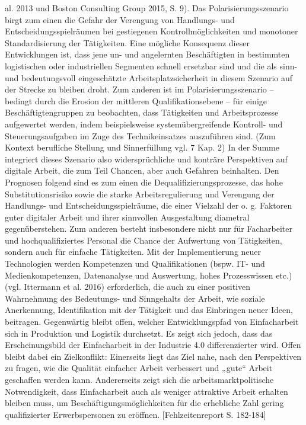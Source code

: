 al. 2013 und Boston Consulting Group 2015, S. 9). Das
Polarisierungsszenario birgt zum einen die Gefahr der
Verengung von Handlungs- und Entscheidungsspielräumen bei gestiegenen Kontrollmöglichkeiten und
monotoner Standardisierung der Tätigkeiten. Eine
mögliche Konsequenz dieser Entwicklungen ist, dass
jene un- und angelernten Beschäftigten in bestimmten
logistischen oder industriellen Segmenten schnell ersetzbar sind und die als sinn- und bedeutungsvoll eingeschätzte Arbeitsplatzsicherheit in diesem Szenario
auf der Strecke zu bleiben droht. Zum anderen ist im
Polarisierungsszenario – bedingt durch die Erosion
der mittleren Qualifikationsebene – für einige Beschäftigtengruppen zu beobachten, dass Tätigkeiten
und Arbeitsprozesse aufgewertet werden, indem beispielsweise systemübergreifende Kontroll- und Steuerungsaufgaben im Zuge des Technikeinsatzes auszuführen sind. (Zum Kontext berufliche Stellung und
Sinnerfüllung vgl. 7 Kap. 2)
In der Summe integriert dieses Szenario also widersprüchliche und konträre Perspektiven auf digitale
Arbeit, die zum Teil Chancen, aber auch Gefahren
beinhalten. Den Prognosen folgend sind es zum einen
die Dequalifizierungsprozesse, das hohe Substitutionsrisiko sowie die starke Arbeitsregulierung und Verengung der Handlungs- und Entscheidungsspielräume,
die einer Vielzahl der o. g. Faktoren guter digitaler Arbeit und ihrer sinnvollen Ausgestaltung diametral gegenüberstehen. Zum anderen besteht insbesondere
nicht nur für Facharbeiter und hochqualifiziertes
Personal die Chance der Aufwertung von Tätigkeiten,
sondern auch für einfache Tätigkeiten. Mit der Implementierung neuer Technologien werden Kompetenzen
und Qualifikationen (bspw. IT- und Medienkompetenzen, Datenanalyse und Auswertung, hohes Prozesswissen etc.) (vgl. Ittermann et al. 2016) erforderlich,
die auch zu einer positiven Wahrnehmung des Bedeutungs- und Sinngehalts der Arbeit, wie soziale
Anerkennung, Identifikation mit der Tätigkeit und das
Einbringen neuer Ideen, beitragen.
Gegenwärtig bleibt offen, welcher Entwicklungspfad von Einfacharbeit sich in Produktion und Logistik durchsetzt. Es zeigt sich jedoch, dass das Erscheinungsbild der Einfacharbeit in der Industrie 4.0 differenzierter wird. Offen bleibt dabei ein Zielkonflikt:
Einerseits liegt das Ziel nahe, nach den Perspektiven zu
fragen, wie die Qualität einfacher Arbeit verbessert
und „gute“ Arbeit geschaffen werden kann. Andererseits zeigt sich die arbeitsmarktpolitische Notwendigkeit, dass Einfacharbeit auch als weniger attraktive
Arbeit erhalten bleiben muss, um Beschäftigungsmöglichkeiten für die erhebliche Zahl gering qualifizierter
Erwerbspersonen zu eröffnen. [Fehlzeitenreport S. 182-184]

